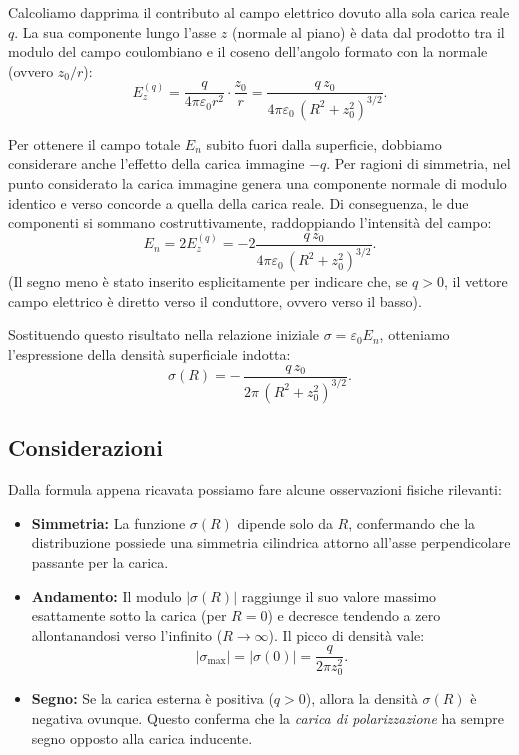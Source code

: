 \documentclass{book}
\begin{document}
Calcoliamo dapprima il contributo al campo elettrico dovuto alla sola carica reale \(q\). La sua componente lungo l'asse \(z\) (normale al piano) è data dal prodotto tra il modulo del campo coulombiano e il coseno dell'angolo formato con la normale (ovvero \(z_0/r\)):
\[
E_z^{(q)}=\frac{q}{4\pi\varepsilon_0 r^2}\cdot\frac{z_0}{r}
=\frac{q\,z_0}{4\pi\varepsilon_0\,(R^2+z_0^2)^{3/2}}.
\]

Per ottenere il campo totale \(E_n\) subito fuori dalla superficie, dobbiamo considerare anche l'effetto della carica immagine \(-q\). Per ragioni di simmetria, nel punto considerato la carica immagine genera una componente normale di modulo identico e verso concorde a quella della carica reale. Di conseguenza, le due componenti si sommano costruttivamente, raddoppiando l'intensità del campo:
\[
E_n = 2 E_z^{(q)} = -2\frac{q\,z_0}{4\pi\varepsilon_0\,(R^2+z_0^2)^{3/2}}.
\]
(Il segno meno è stato inserito esplicitamente per indicare che, se \(q>0\), il vettore campo elettrico è diretto verso il conduttore, ovvero verso il basso).

Sostituendo questo risultato nella relazione iniziale \(\sigma=\varepsilon_0 E_n\), otteniamo l'espressione della densità superficiale indotta:
\[
\sigma(R) = -\,\frac{q\,z_0}{2\pi\,(R^2+z_0^2)^{3/2}}.
\]

\subsection*{Considerazioni}
Dalla formula appena ricavata possiamo fare alcune osservazioni fisiche rilevanti:
\begin{itemize}
  \item \textbf{Simmetria:} La funzione \(\sigma(R)\) dipende solo da \(R\), confermando che la distribuzione possiede una simmetria cilindrica attorno all'asse perpendicolare passante per la carica.
  \item \textbf{Andamento:} Il modulo \(|\sigma(R)|\) raggiunge il suo valore massimo esattamente sotto la carica (per \(R=0\)) e decresce tendendo a zero allontanandosi verso l'infinito (\(R\to\infty\)). Il picco di densità vale:
  \[
  |\sigma_{\max}|=\left|\sigma(0)\right|=\frac{q}{2\pi z_0^2}.
  \]
  \item \textbf{Segno:} Se la carica esterna è positiva (\(q>0\)), allora la densità \(\sigma(R)\) è negativa ovunque. Questo conferma che la \emph{carica di polarizzazione} ha sempre segno opposto alla carica inducente.
\end{itemize}
\end{document}
